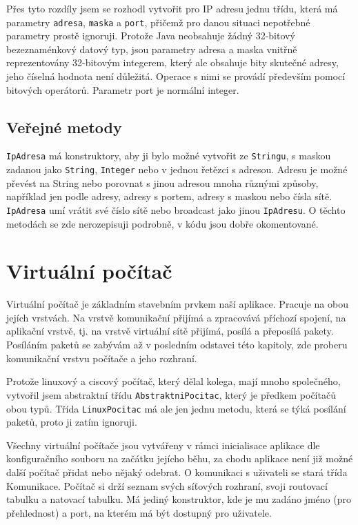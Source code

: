 Přes tyto rozdíly jsem se rozhodl vytvořit pro IP adresu jednu třídu, která má parametry \verb|adresa|, \verb|maska| a \verb|port|, přičemž pro danou situaci nepotřebné parametry prostě ignoruji. Protože Java neobsahuje žádný 32-bitový bezeznaménkový datový typ, jsou parametry adresa a maska vnitřně reprezentovány 32-bitovým integerem, který ale obsahuje bity skutečné adresy, jeho číselná hodnota není důležitá. Operace s nimi se provádí především pomocí bitových operátorů. Parametr port je normální integer.


\subsection{Veřejné metody}

\verb|IpAdresa| má konstruktory, aby ji bylo možné vytvořit ze \verb|Stringu|, s maskou zadanou jako \verb|String|, \verb|Integer| nebo v jednou řetězci s adresou. Adresu je možné převést na String nebo porovnat s jinou adresou mnoha různými způsoby, například jen podle adresy, adresy s portem,  adresy s maskou nebo čísla sítě. \verb|IpAdresa| umí vrátit své číslo sítě nebo broadcast jako jinou \verb|IpAdresu|. O těchto metodách se zde nerozepisuji podrobně, v kódu jsou dobře okomentované.




\section{Virtuální počítač}

Virtuální počítač je základním stavebním prvkem naší aplikace. Pracuje na obou jejích vrstvách. Na vrstvě komunikační přijímá a zpracovává příchozí spojení, na aplikační vrstvě, tj. na vrstvě virtuální sítě přijímá, posílá a přeposílá pakety. Posíláním paketů se zabývám až v posledním odstavci této kapitoly, zde proberu komunikační vrstvu počítače a jeho rozhraní.

Protože linuxový a ciscový počítač, který dělal kolega, mají mnoho společného, vytvořil jsem abstraktní třídu \verb|AbstraktniPocitac|, který je předkem počítačů obou typů. Třída \verb|LinuxPocitac| má ale jen jednu metodu, která se týká posílání paketů, proto ji zatím ignoruji.

Všechny virtuální počítače jsou vytvářeny v rámci inicialisace aplikace dle konfiguračního souboru na začátku jejícho běhu, za chodu aplikace není již možné další počítač přidat nebo nějaký odebrat. O komunikaci s uživateli se stará třída Komunikace. Počítač si drží seznam svých síťových rozhraní, svoji routovací tabulku a natovací tabulku. Má jediný konstruktor, kde je mu zadáno jméno (pro přehlednost) a port, na kterém má být dostupný pro uživatele.


